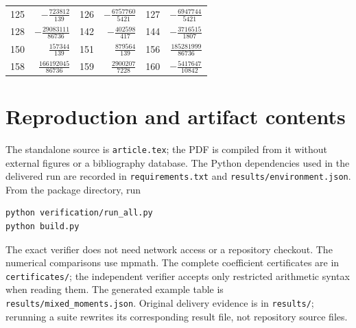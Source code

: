 \documentclass[11pt,letterpaper]{article}
\numberwithin{equation}{section}
\theoremstyle{definition}\newtheorem{definition}[theorem]{Definition}
\theoremstyle{remark}\newtheorem{remark}[theorem]{Remark}
\newcommand{\sref}[1]{\texttt{#1}}
\begin{document}
\begin{center}
\begin{tabular}{rr@{\qquad}rr@{\qquad}rr}
125&$- \frac{723812}{139}$&126&$- \frac{6757760}{5421}$&127&$- \frac{6947744}{5421}$\\[3pt]

128&$- \frac{29083111}{86736}$&142&$- \frac{402598}{417}$&144&$- \frac{3716515}{1807}$\\[3pt]

150&$\frac{157344}{139}$&151&$\frac{879564}{139}$&156&$\frac{185281999}{86736}$\\[3pt]

158&$\frac{166192045}{86736}$&159&$\frac{2900207}{7228}$&160&$- \frac{5417647}{10842}$\\[3pt]

\bottomrule
\end{tabular}
\end{center}


\section{Reproduction and artifact contents}
\label{app:repro}

The standalone source is \sref{article.tex}; the PDF is compiled
from it without external figures or a bibliography database.
The Python dependencies used in the delivered run are recorded
in \sref{requirements.txt} and \sref{results/environment.json}.
From the package directory, run
\begin{verbatim}
python verification/run_all.py
python build.py
\end{verbatim}
The exact verifier does not need network access or a repository
checkout. The numerical comparisons use mpmath. The complete
coefficient certificates are in \sref{certificates/}; the independent
verifier accepts only restricted arithmetic syntax when reading them.
The generated example table is \sref{results/mixed\_moments.json}.
Original delivery evidence is in \sref{results/}; rerunning a suite
rewrites its corresponding result file, not repository source files.
\end{document}
